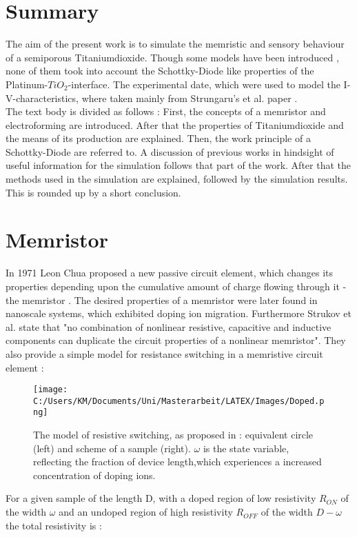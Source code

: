 \documentclass[12pt]{article}
\begin{document}
\normalsize
		\section{Summary}
		\label{sec:Summary}
		The aim of the present work is to simulate the memristic and sensory behaviour of a semiporous Titaniumdioxide. Though some models have been introduced \cite{Achhab, Strungaru, Missing}, none of them took into account the Schottky-Diode like properties of the Platinum-$TiO_2$-interface. The experimental date, which were used to model the I-V-characteristics, where taken mainly from Strungaru's et al. paper \cite{Strungaru}.\\
		The text body is divided as follows : First, the concepts of a memristor and electroforming are introduced. After that the properties of Titaniumdioxide and the means of its production are explained. Then, the work principle of a Schottky-Diode are referred to. A discussion of previous works in hindsight of useful information for the simulation follows that part of the work. After that the methods used in the simulation are explained, followed by the simulation results. This is rounded up by a short conclusion.

\newpage
		\section{Memristor}
		\label{sec:Memristor}
	In 1971 Leon Chua proposed a new passive circuit element, which changes its properties depending upon the cumulative amount of charge flowing through it - the memristor \cite{Missing}. The desired properties of a memristor were later found in nanoscale systems, which exhibited doping ion migration. Furthermore Strukov et al. \cite{Missing} state that "no combination of nonlinear resistive, capacitive and inductive components can duplicate the circuit properties of a nonlinear memristor". They also provide a simple model for resistance switching in a memristive circuit element :
\begin{figure}[H]
	\centering
		\texttt{[image: C:/Users/KM/Documents/Uni/Masterarbeit/LATEX/Images/Doped.png]}
	\label{fig:Doped}
	\caption{The model of resistive switching, as proposed in \cite{Missing}: equivalent circle (left) and scheme of a sample (right). $\omega$ is the state variable, reflecting the fraction of device length,which experiences a increased concentration of doping ions.}
\end{figure}
For a given sample of the length D, with a doped region of low resistivity \(R_{ON}\) of the width $\omega$ and an undoped region of high resistivity \(R_{OFF}\) of the width \(D-\omega\) the total resistivity is : 
\end{document}
